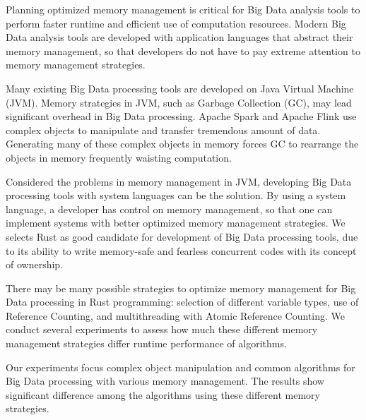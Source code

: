 


Planning optimized memory management is critical for Big Data analysis tools to perform faster runtime and efficient use of computation resources.
Modern Big Data analysis tools are developed with application languages that abstract their memory management, so that developers do not have to pay extreme attention to memory management strategies.

Many existing Big Data processing tools are developed on Java Virtual Machine (JVM). 
Memory strategies in JVM, such as Garbage Collection (GC), may lead significant overhead in Big Data processing. 
Apache Spark and Apache Flink use complex objects to manipulate and transfer tremendous amount of data. 
Generating many of these complex objects in memory forces GC to rearrange the objects in memory frequently waisting computation. 

Considered the problems in memory management in JVM, developing Big Data processing tools with system languages can be the solution.
By using a system language, a developer has control on memory management, so that one can implement systems with better optimized memory management strategies.
We selects Rust as good candidate for development of Big Data processing tools, due to its ability to write memory-safe and fearless concurrent codes with its concept of ownership.

There may be many possible strategies to optimize memory management for Big Data processing in Rust programming: 
selection of different variable types, use of Reference Counting, and multithreading with Atomic Reference Counting.
We conduct several experiments to assess how much these different memory management strategies differ runtime performance of algorithms.

Our experiments focus complex object manipulation and common algorithms for Big Data processing with various memory management.
The results show significant difference among the algorithms using these different memory strategies.